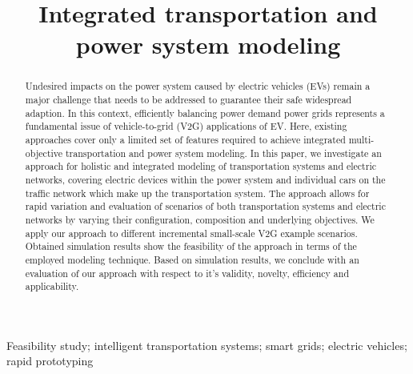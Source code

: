 \title{Integrated transportation and power system modeling}

\author{
	\and
}

\maketitle

\begin{abstract}
Undesired impacts on the power system caused by electric vehicles (EVs) remain a major challenge that needs to be addressed to guarantee their safe widespread adaption. In this context, efficiently balancing power demand power grids represents a fundamental issue of vehicle-to-grid (V2G) applications of EV. Here, existing approaches cover only a limited set of features required to achieve integrated multi-objective transportation and power system modeling. In this paper, we investigate an approach for holistic and integrated modeling of transportation systems and electric networks, covering electric devices within the power system and individual cars on the traffic network which make up the
transportation system. The approach allows for rapid variation and evaluation of scenarios of both transportation systems and electric networks by varying their configuration, composition and underlying objectives. We apply our approach to different incremental small-scale V2G example scenarios. Obtained simulation results show the feasibility of the approach in terms of the employed modeling technique. Based on simulation results, we conclude with an evaluation of our approach with respect to it's validity, novelty, efficiency and applicability.
\end{abstract}

\begin{keywords}
Feasibility study; intelligent transportation systems; smart grids; electric vehicles; rapid prototyping
\end{keywords}